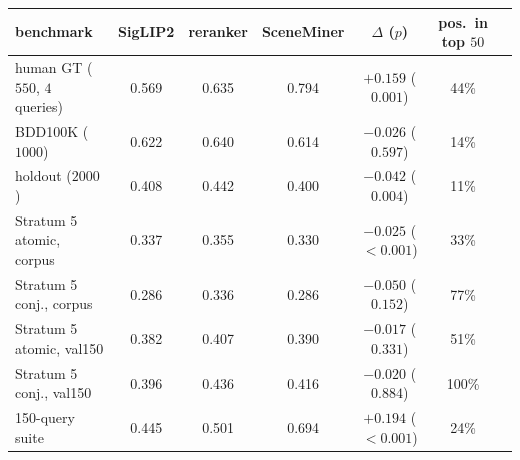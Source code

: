 \begin{tabular}{lcccccc}
\toprule
benchmark & SigLIP2 & reranker & SceneMiner & $\Delta$ ($p$) & pos.\ in top $50$\\
\midrule
human GT ($550$, $4$ queries) & 0.569 & 0.635 & 0.794 & $+0.159$ ($0.001$) & 44\%\\
BDD100K ($1000$) & 0.622 & 0.640 & 0.614 & $-0.026$ ($0.597$) & 14\%\\
holdout ($2000$) & 0.408 & 0.442 & 0.400 & $-0.042$ ($0.004$) & 11\%\\
Stratum 5 atomic, corpus & 0.337 & 0.355 & 0.330 & $-0.025$ ($<0.001$) & 33\%\\
Stratum 5 conj., corpus & 0.286 & 0.336 & 0.286 & $-0.050$ ($0.152$) & 77\%\\
Stratum 5 atomic, val150 & 0.382 & 0.407 & 0.390 & $-0.017$ ($0.331$) & 51\%\\
Stratum 5 conj., val150 & 0.396 & 0.436 & 0.416 & $-0.020$ ($0.884$) & 100\%\\
150-query suite & 0.445 & 0.501 & 0.694 & $+0.194$ ($<0.001$) & 24\%\\
\bottomrule
\end{tabular}
